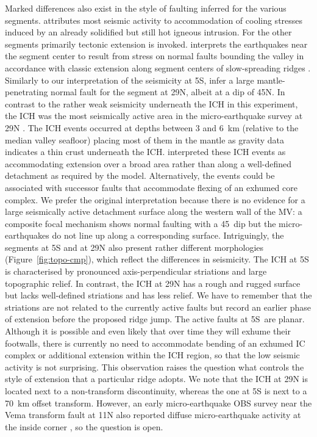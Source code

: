 \documentclass[jgr]{agu2001}
\renewcommand{\remark}[1]{}
\newlength{\tw}
\begin{document}
\begin{article}
Marked differences also
exist in  the style of faulting inferred for the various segments.
\citet{kong92} attributes most seismic activity to accommodation of
cooling stresses induced by an already solidified but still hot
igneous intrusion. For the other segments primarily tectonic extension
is invoked.  \citet{barclay01} interprets the earthquakes 
 near the
segment center to result from  stress on normal faults bounding the
valley in accordance with classic extension along segment centers of
slow-spreading ridges \citep{mutter92}.   Similarly to our
interpretation of the seismicity at 5\dg S, \citet{toomey88} infer a
large mantle-penetrating 
normal fault for the segment at 29\dg N, albeit
at a dip of 45\dg N.  In contrast to the rather weak seismicity
underneath the ICH in this experiment, the ICH was the most
seismically active area in the micro-earthquake survey at 29\dg N
\citep{wolfe95}.  The ICH events occurred at depths between 3
and 6~km (relative to the median valley seafloor) placing most of them
in the mantle as gravity data
indicates a thin crust underneath the ICH.  \citet{wolfe95} interpreted
these ICH events as accommodating extension over a broad area rather
than along a well-defined detachment as required by the
\citet{tucholke94} model. Alternatively, the events could be
associated with successor faults that accommodate flexing of an
exhumed core complex.  We prefer the original interpretation because
there is no evidence for a large seismically active detachment surface
along the western wall of the MV: a composite focal mechanism shows
normal faulting with a 45\dg\ dip but the micro-earthquakes do not
line up along  a corresponding surface.
Intriguingly, the segments at 5\dg S and at 29\dg N also
present rather different morphologies (Figure~\ref{fig:topo-cmp}),
which reflect the differences in seismicity.  The ICH at
5\dg S is characterised by pronounced axis-perpendicular striations
and large topographic relief.  In contrast, the ICH at 29\dg N has a
rough and rugged surface but lacks well-defined striations and has
less relief. We have to remember that the striations are not
related to the currently active faults but record an earlier phase of
extension before the proposed ridge jump. The active faults at 5\dg S\ are planar. Although it is possible and even likely that
over time they will exhume their footwalls, there is currently no need to accommodate  bending
of an exhumed IC complex or additional extension within the ICH
region, so that the low seismic activity is not surprising.
 This observation raises  the question what
controls the style of extension that a particular ridge adopts.   We
note that the
ICH at 29\dg N is located next to a non-transform discontinuity,
whereas the one at 5\dg S is next to a 70~km offset transform. However,
an early micro-earthquake OBS survey near the Vema transform fault at
11\dg N also reported diffuse micro-earthquake activity at the inside
corner \citep{rowlett84}, so the question is open.  


\end{article}
\end{document}
